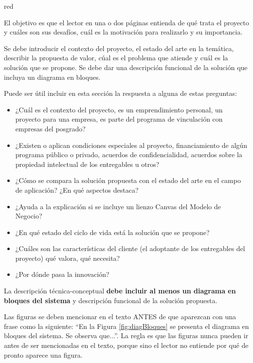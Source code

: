 \begin{consigna}{red} %

El objetivo es que el lector en una o dos páginas entienda de qué trata el proyecto y cuáles son sus desafíos, cuál es la motivación para realizarlo y su importancia.

Se debe introducir el contexto del proyecto, el estado del arte en la temática, describir la propuesta de valor, cúal es el problema que atiende y cuál es la solución que se propone. Se debe dar una descripción funcional de la solución que incluya un diagrama en bloques.

Puede ser útil incluir en esta sección la respuesta a alguna de estas preguntas:

\begin{itemize}
	\item ¿Cuál es el contexto del proyecto, es un emprendimiento personal, un proyecto para una empresa, es parte del programa de vinculación con empresas del posgrado?
	\item ¿Existen o aplican condiciones especiales al proyecto, financiamiento de algún programa público o privado, acuerdos de confidencialidad, acuerdos sobre la propiedad intelectual de los entregables u otros?
	\item ¿Cómo se compara la solución propuesta con el estado del arte en el campo de aplicación? ¿En qué aspectos destaca?
	\item ¿Ayuda a la explicación si se incluye un lienzo Canvas del Modelo de Negocio?
	\item ¿En qué estado del ciclo de vida está la solución que se propone?
	\item ¿Cuáles son las características del cliente (el adoptante de los entregables del proyecto) qué valora, qué necesita?
	\item ¿Por dónde pasa la innovación?
\end{itemize}

La descripción técnica-conceptual \textbf{debe incluir al menos un diagrama en bloques del sistema} y descripción funcional de la solución propuesta.

Las figuras se deben mencionar en el texto ANTES de que aparezcan con una frase como la siguiente: ``En la Figura \ref{fig:diagBloques} se presenta el diagrama en bloques del sistema. Se observa que...''.  La regla es que las figuras nunca pueden ir antes de ser mencionadas en el texto, porque sino el lector no entiende por qué de pronto aparece una figura.


\end{consigna}
